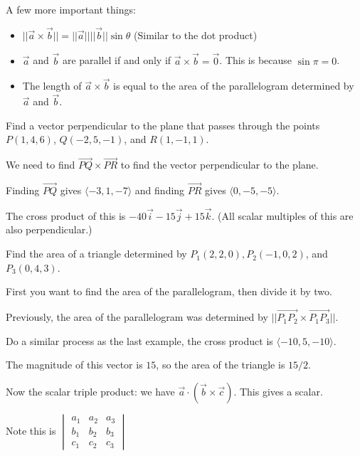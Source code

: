 \documentclass[../calc3.tex]{subfiles}
\begin{document}
A few more important things:
\begin{itemize}
    \item $||\vec{a}\times \vec{b}||=||\vec{a}||||\vec{b}||\sin\theta$ (Similar to the dot product)
    \item $\vec{a}$ and $\vec{b}$ are parallel if and only if $\vec{a}\times \vec{b}=\vec{0}$. This is because $\sin\pi = 0$.
    \item The length of $\vec{a}\times \vec{b}$ is equal to the area of the parallelogram determined by $\vec{a}$ and $\vec{b}$.
\end{itemize}

\begin{example}
    Find a vector perpendicular to the plane that passes through the points $P(1,4,6)$, $Q(-2,5,-1)$, and $R(1,-1,1)$.

    We need to find $\overrightarrow{PQ}\times \overrightarrow{PR}$ to find the vector perpendicular to the plane.

    Finding $\overrightarrow{PQ}$ gives $\langle -3,1,-7\rangle$ and finding $\overrightarrow{PR}$ gives $\langle 0,-5,-5\rangle$.

    The cross product of this is $-40\vec{i}-15\vec{j}+15\vec{k}$. (All scalar multiples of this are also perpendicular.)
\end{example}

\begin{example}
    Find the area of a triangle determined by $P_1(2,2,0), P_2(-1,0,2)$, and $P_3(0,4,3)$.

    First you want to find the area of the parallelogram, then divide it by two.

    Previously, the area of the parallelogram was determined by $||\overrightarrow{P_1P_2}\times \overrightarrow{P_1P_3}||$.

    Do a similar process as the last example, the cross product is $\langle -10,5,-10\rangle$.

    The magnitude of this vector is $15$, so the area of the triangle is $15/2$.
\end{example}

Now the scalar triple product: we have $\vec{a}\cdot (\vec{b}\times \vec{c})$. This gives a scalar.

Note this is $\begin{vmatrix}
    a_1 & a_2 & a_3\\
    b_1 & b_2 & b_3\\
    c_1 & c_2 & c_3
\end{vmatrix}$
\end{document}
